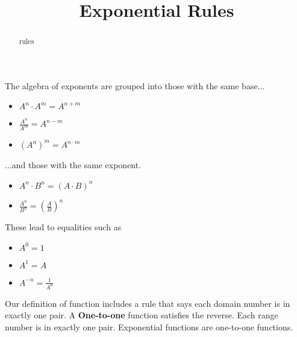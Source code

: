 \documentclass{ximera}
\title{Exponential Rules}
\begin{document}
\begin{abstract}
rules
\end{abstract}
\maketitle





The algebra of exponents are grouped into those with the same base...



\begin{itemize}
\item $A^n \cdot A^m = A^{n+m}$
\item $\frac{A^n}{A^m} = A^{n-m}$
\item $(A^n)^m = A^{n \cdot m}$ \\
\end{itemize}

...and those with the same exponent. 

\begin{itemize}
\item $A^n \cdot B^n = (A \cdot B)^n$
\item $\frac{A^n}{B^n} = \left(\frac{A}{B}\right)^n$ \\
\end{itemize}




These lead to equalities such as



\begin{itemize}
\item $A^0 = 1$
\item $A^1 = A$
\item $A^{-n} = \frac{1}{A^n}$
\end{itemize}



Our definition of function includes a rule that says each domain number is in exactly one pair.  A \textbf{One-to-one} function satisfies the reverse.  Each range number is in exactly one pair.  Exponential functions are one-to-one functions.
\end{document}
